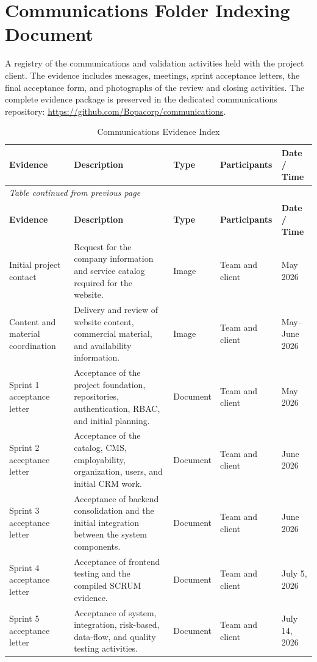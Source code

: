 \documentclass[letterpaper%
, oneside%
, 12pt%
, memoireprojet%
, english%
,creativecommons,hyperref, withAlgo2e %
]{thETS}
\begin{document}
\section{Communications Folder Indexing Document}
A registry of the communications and validation activities held with the project client. The
evidence includes messages, meetings, sprint acceptance letters, the final acceptance form, and
photographs of the review and closing activities. The complete evidence package is preserved in the
dedicated communications repository: \url{https://github.com/Bopacorp/communications}.

\begingroup
\footnotesize
\begin{longtable}{|p{3.3cm}|p{4.5cm}|p{1.4cm}|p{2.6cm}|p{2.3cm}|}
\caption{Communications Evidence Index}
\label{tab:communications_index}\\
\hline
\textbf{Evidence} & \textbf{Description} & \textbf{Type} & \textbf{Participants} & \textbf{Date / Time} \\
\hline
\endfirsthead
\multicolumn{5}{l}{\textit{Table continued from previous page}} \\
\hline
\textbf{Evidence} & \textbf{Description} & \textbf{Type} & \textbf{Participants} & \textbf{Date / Time} \\
\hline
\endhead
Initial project contact & Request for the company information and service catalog required for the website. & Image & Team and client & May 2026 \\
\hline
Content and material coordination & Delivery and review of website content, commercial material, and availability information. & Image & Team and client & May--June 2026 \\
\hline
Sprint 1 acceptance letter & Acceptance of the project foundation, repositories, authentication, RBAC, and initial planning. & Document & Team and client & May 2026 \\
\hline
Sprint 2 acceptance letter & Acceptance of the catalog, CMS, employability, organization, users, and initial CRM work. & Document & Team and client & June 2026 \\
\hline
Sprint 3 acceptance letter & Acceptance of backend consolidation and the initial integration between the system components. & Document & Team and client & June 2026 \\
\hline
Sprint 4 acceptance letter & Acceptance of frontend testing and the compiled SCRUM evidence. & Document & Team and client & July 5, 2026 \\
\hline
Sprint 5 acceptance letter & Acceptance of system, integration, risk-based, data-flow, and quality testing activities. & Document & Team and client & July 14, 2026 \\

\end{longtable}
\end{document}
